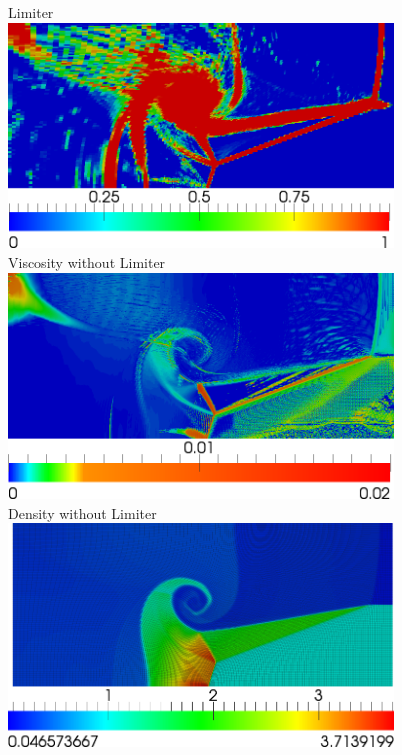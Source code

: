 \documentclass[8pt,xcolor=svgnames]{beamer}
\begin{document}
\begin{frame}
{\begin{columns}
\begin{column}{0.45\textwidth}
\begin{center}
\end{center}
\end{column}
\begin{column}{0.45\textwidth}
\begin{center}
Limiter\\
\includegraphics[width=0.8\textwidth]{figs/TriplePt/Q2-4-limiter-limiter.png}\\
Viscosity without Limiter\\
\includegraphics[width=0.8\textwidth]{figs/TriplePt/Q2-4-viscosity-nolimiter.png}\\
Density without Limiter\\
\includegraphics[width=0.8\textwidth]{figs/TriplePt/Q2-4-density-nolimiter.png}\\
\end{center}
\end{column}
\end{columns}
}
\end{frame}
\end{document}
